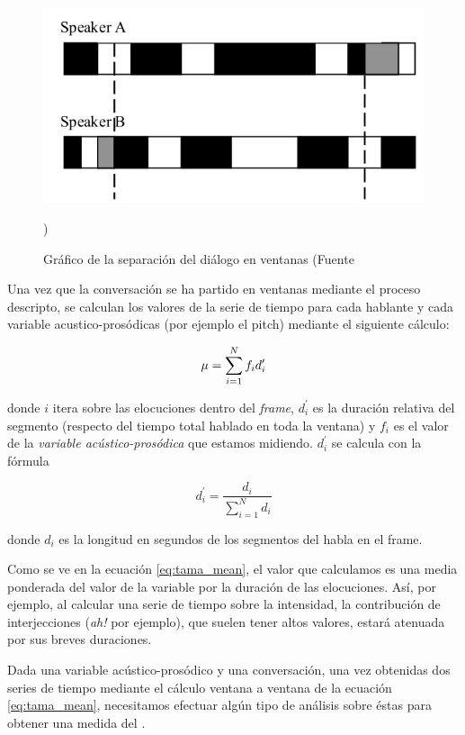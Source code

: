 \begin{figure}[h!]
\centering
\includegraphics[width=\textwidth]{images/tama.png}
\caption{Gráfico de la separación del diálogo en ventanas (Fuente \cite{KOU2008.2}})
\label{tama}
\end{figure}

Una vez que la conversación se ha partido en ventanas mediante el proceso descripto, se calculan los valores de la serie de tiempo para cada hablante y cada variable acustico-prosódicas (por ejemplo el pitch) mediante el siguiente cálculo:

\begin{equation}
    \mu = \sum\limits_{i=1}^N f_i d_i^\prime \label{eq:tama_mean}\\
\end{equation}

\noindent donde $i$ itera sobre las elocuciones dentro del \emph{frame}, $d_i^\prime$ es la duración relativa del segmento (respecto del tiempo total hablado en toda la ventana) y $f_i$ es el valor de la \emph{variable acústico-prosódica} que estamos midiendo. $d_i^\prime$ se calcula con la fórmula

\begin{equation}
d_i^\prime = \frac{d_i}{\sum\limits_{i=1}^N d_i}
\end{equation}

\noindent donde $d_i$ es la longitud en segundos de los segmentos del habla en el frame.

Como se ve en la ecuación \ref{eq:tama_mean}, el valor que calculamos es una media ponderada del valor de la variable por la duración de las elocuciones. Así, por ejemplo, al calcular una serie de tiempo sobre la intensidad, la contribución de interjecciones (\emph{ah!} por ejemplo), que suelen tener altos valores, estará atenuada por sus breves duraciones.

Dada una variable acústico-prosódico y una conversación, una vez obtenidas  dos series de tiempo mediante el cálculo ventana a ventana de la ecuación \ref{eq:tama_mean}, necesitamos efectuar algún tipo de análisis sobre éstas para obtener una medida del \entrainment.
